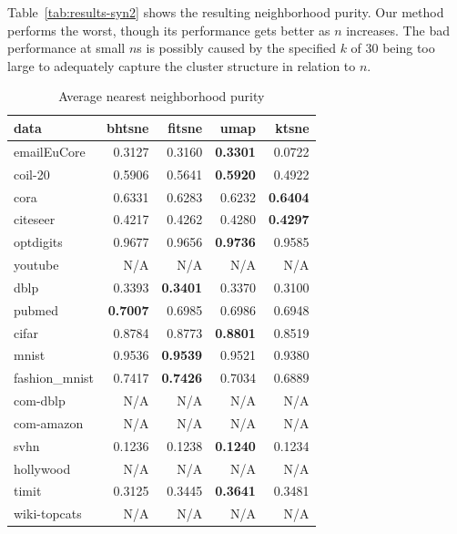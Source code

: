 Table~\ref{tab:results-syn2} shows the resulting neighborhood purity. Our method performs the worst,
though its performance gets better as $n$ increases. The bad performance at small $n$s is possibly
caused by the specified $k$ of 30 being too large to adequately capture the cluster structure in relation
to $n$.
\begin{table}[tb]
  \centering
\begin{subtable}{\linewidth}
  \centering
  \begin{tabular}{lrrrr}
    \toprule
data & bhtsne & fitsne & umap & ktsne \\ \midrule
emailEuCore & \num{0.3127} & \num{0.3160} & \bfseries \num{0.3301} & \num{0.0722} \\
coil-20 & \num{0.5906} & \num{0.5641} & \bfseries \num{0.5920} & \num{0.4922} \\
cora & \num{0.6331} & \num{0.6283} & \num{0.6232} & \bfseries \num{0.6404} \\
citeseer & \num{0.4217} & \num{0.4262} & \num{0.4280} & \bfseries \num{0.4297} \\
optdigits & \num{0.9677} & \num{0.9656} & \bfseries \num{0.9736} & \num{0.9585} \\
youtube & N/A & N/A & N/A & N/A \\
dblp & \num{0.3393} & \bfseries \num{0.3401} & \num{0.3370} & \num{0.3100} \\
pubmed & \bfseries \num{0.7007} & \num{0.6985} & \num{0.6986} & \num{0.6948} \\
cifar & \num{0.8784} & \num{0.8773} & \bfseries \num{0.8801} & \num{0.8519} \\
mnist & \num{0.9536} & \bfseries \num{0.9539} & \num{0.9521} & \num{0.9380} \\
fashion\_mnist & \num{0.7417} & \bfseries \num{0.7426} & \num{0.7034} & \num{0.6889} \\
com-dblp & N/A & N/A & N/A & N/A \\
com-amazon & N/A & N/A & N/A & N/A \\
svhn & \num{0.1236} & \num{0.1238} & \bfseries \num{0.1240} & \num{0.1234} \\
hollywood & N/A & N/A & N/A & N/A \\
timit & \num{0.3125} & \num{0.3445} & \bfseries \num{0.3641} & \num{0.3481} \\
wiki-topcats & N/A & N/A & N/A & N/A \\
\bottomrule
  \end{tabular}
  \caption{Average nearest neighborhood purity}

\end{subtable}
\end{table}
